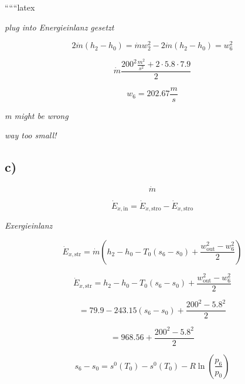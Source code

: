 ``````latex


\textit{plug into Energieinlanz gesetzt}

\begin{equation*}
2\dot{m}(h_2 - h_0) = \dot{m}w_2^2 - 2\dot{m}(h_2 - h_0) = w_6^2
\end{equation*}

\begin{equation*}
\dot{m} \frac{200^2 \frac{m^2}{s^2} + 2 \cdot 5.8 \cdot 7.9}{2}
\end{equation*}

\begin{equation*}
w_6 = 202.67 \frac{m}{s}
\end{equation*}

\textit{m might be wrong}

\textit{way too small!}

\subsection*{c)}

\begin{equation*}
\dot{m}
\end{equation*}

\begin{equation*}
\dot{E}_{x, \text{in}} = \dot{E}_{x, \text{stro}} - \dot{E}_{x, \text{stro}}
\end{equation*}

\textit{Exergieinlanz}

\begin{equation*}
\dot{E}_{x, \text{str}} = \dot{m} \left( h_2 - h_0 - T_0 (s_6 - s_0) + \frac{w_{\text{out}}^2 - w_6^2}{2} \right)
\end{equation*}

\begin{equation*}
\dot{E}_{x, \text{str}} = h_2 - h_0 - T_0 (s_6 - s_0) + \frac{w_{\text{out}}^2 - w_6^2}{2}
\end{equation*}

\begin{equation*}
= 79.9 - 243.15 (s_6 - s_0) + \frac{200^2 - 5.8^2}{2}
\end{equation*}

\begin{equation*}
= 968.56 + \frac{200^2 - 5.8^2}{2}
\end{equation*}

\begin{equation*}
s_6 - s_0 = s^0 (T_0) - s^0 (T_0) - R \ln \left( \frac{p_6}{p_0} \right)
\end{equation*}

